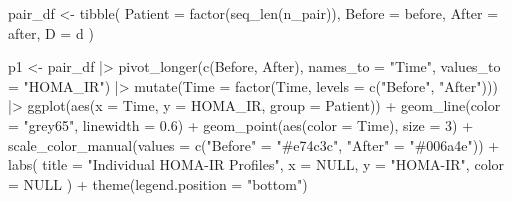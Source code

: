 \documentclass[
  letterpaper,
  DIV=11,
  numbers=noendperiod]{scrartcl}
\newenvironment{Shaded}{\begin{snugshade}}{\end{snugshade}}
\newcommand{\AttributeTok}[1]{\textcolor[rgb]{0.40,0.45,0.13}{#1}}
\newcommand{\ConstantTok}[1]{\textcolor[rgb]{0.56,0.35,0.01}{#1}}
\newcommand{\DecValTok}[1]{\textcolor[rgb]{0.68,0.00,0.00}{#1}}
\newcommand{\FloatTok}[1]{\textcolor[rgb]{0.68,0.00,0.00}{#1}}
\newcommand{\FunctionTok}[1]{\textcolor[rgb]{0.28,0.35,0.67}{#1}}
\newcommand{\NormalTok}[1]{\textcolor[rgb]{0.00,0.23,0.31}{#1}}
\newcommand{\OtherTok}[1]{\textcolor[rgb]{0.00,0.23,0.31}{#1}}
\newcommand{\SpecialCharTok}[1]{\textcolor[rgb]{0.37,0.37,0.37}{#1}}
\newcommand{\StringTok}[1]{\textcolor[rgb]{0.13,0.47,0.30}{#1}}
\begin{document}
\begin{Shaded}
\begin{Highlighting}[]
\NormalTok{pair\_df }\OtherTok{\textless{}{-}} \FunctionTok{tibble}\NormalTok{(}
  \AttributeTok{Patient =} \FunctionTok{factor}\NormalTok{(}\FunctionTok{seq\_len}\NormalTok{(n\_pair)),}
  \AttributeTok{Before  =}\NormalTok{ before,}
  \AttributeTok{After   =}\NormalTok{ after,}
  \AttributeTok{D       =}\NormalTok{ d}
\NormalTok{)}

\NormalTok{p1 }\OtherTok{\textless{}{-}}\NormalTok{ pair\_df }\SpecialCharTok{|\textgreater{}}
  \FunctionTok{pivot\_longer}\NormalTok{(}\FunctionTok{c}\NormalTok{(Before, After), }\AttributeTok{names\_to =} \StringTok{"Time"}\NormalTok{, }\AttributeTok{values\_to =} \StringTok{"HOMA\_IR"}\NormalTok{) }\SpecialCharTok{|\textgreater{}}
  \FunctionTok{mutate}\NormalTok{(}\AttributeTok{Time =} \FunctionTok{factor}\NormalTok{(Time, }\AttributeTok{levels =} \FunctionTok{c}\NormalTok{(}\StringTok{"Before"}\NormalTok{, }\StringTok{"After"}\NormalTok{))) }\SpecialCharTok{|\textgreater{}}
  \FunctionTok{ggplot}\NormalTok{(}\FunctionTok{aes}\NormalTok{(}\AttributeTok{x =}\NormalTok{ Time, }\AttributeTok{y =}\NormalTok{ HOMA\_IR, }\AttributeTok{group =}\NormalTok{ Patient)) }\SpecialCharTok{+}
  \FunctionTok{geom\_line}\NormalTok{(}\AttributeTok{color =} \StringTok{"grey65"}\NormalTok{, }\AttributeTok{linewidth =} \FloatTok{0.6}\NormalTok{) }\SpecialCharTok{+}
  \FunctionTok{geom\_point}\NormalTok{(}\FunctionTok{aes}\NormalTok{(}\AttributeTok{color =}\NormalTok{ Time), }\AttributeTok{size =} \DecValTok{3}\NormalTok{) }\SpecialCharTok{+}
  \FunctionTok{scale\_color\_manual}\NormalTok{(}\AttributeTok{values =} \FunctionTok{c}\NormalTok{(}\StringTok{"Before"} \OtherTok{=} \StringTok{"\#e74c3c"}\NormalTok{, }\StringTok{"After"} \OtherTok{=} \StringTok{"\#006a4e"}\NormalTok{)) }\SpecialCharTok{+}
  \FunctionTok{labs}\NormalTok{(}
    \AttributeTok{title  =} \StringTok{"Individual HOMA{-}IR Profiles"}\NormalTok{,}
    \AttributeTok{x      =} \ConstantTok{NULL}\NormalTok{,}
    \AttributeTok{y      =} \StringTok{"HOMA{-}IR"}\NormalTok{,}
    \AttributeTok{color  =} \ConstantTok{NULL}
\NormalTok{  ) }\SpecialCharTok{+}
  \FunctionTok{theme}\NormalTok{(}\AttributeTok{legend.position =} \StringTok{"bottom"}\NormalTok{)}


\end{Highlighting}
\end{Shaded}
\end{document}
